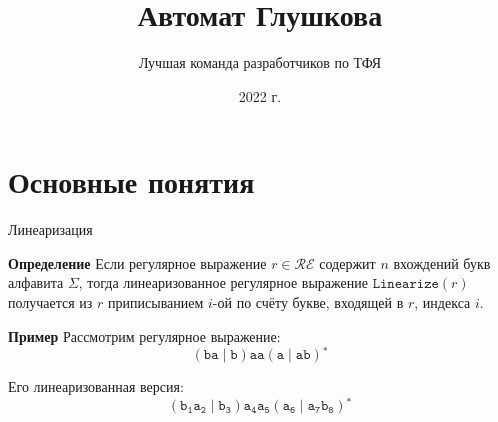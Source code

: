 \documentclass[mathserif]{beamer}
\title[] {Автомат Глушкова}
\author[Chipollino]{Лучшая команда разработчиков по ТФЯ} %
\date[] 
{2022 г.}
\def\Linearize{\mathtt{Linearize}} %
\def\alter{\ensuremath{\mathrel{\vert}}}%
\def\star{\ensuremath{^{*}}}%
\def\regexpstr#1{\mathtt{#1}}%
\newcommand{\RegExp}{\mathcal{RE}} %
\begin{document}
\maketitle
\section{Основные понятия}
\begin{frame}{Линеаризация}
    \begin{block}{\bf Определение}
        Если регулярное выражение $r\in\RegExp$ содержит $n$ вхождений букв алфавита $\Sigma$, тогда линеаризованное регулярное выражение $\Linearize(r)$ получается из $r$ приписыванием $i$-ой по счёту букве, входящей в $r$, индекса $i$.
    \end{block} %

    \begin{exampleblock}{\bf Пример}
        Рассмотрим регулярное выражение:
        \[(\regexpstr{ba}\alter \regexpstr{b})\regexpstr{aa}(\regexpstr{a}\alter\regexpstr{ab})\star\] %

        Его линеаризованная версия:
        \[(\regexpstr{b_{1}a_{2}}\alter \regexpstr{b_{3}})\regexpstr{a_{4}a_{5}}(\regexpstr{a_{6}}\alter\regexpstr{a_{7}b_{8}})\star\] %

    \end{exampleblock}

\end{frame}
\end{document}

